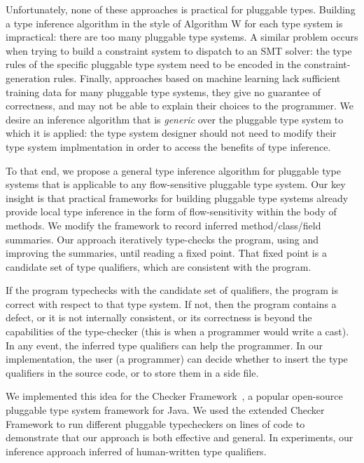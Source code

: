 Unfortunately, none of these approaches is practical for pluggable types.
Building a type inference algorithm in the style of Algorithm W for each
type system is impractical: there are too many pluggable type
systems.
A similar problem occurs when trying to build a constraint system to
dispatch to an SMT solver: the type rules of the specific pluggable type system
need to be encoded in the constraint-generation rules. Finally, approaches
based on machine learning lack sufficient training data for
many pluggable type systems, they give no guarantee of correctness, and may
not be able to explain their choices to the programmer.
%
We desire an
inference algorithm that is \emph{generic} over the pluggable type system
to which it is applied: the type system designer should not need to
modify their type system implmentation in order to access
the benefits of type inference.

To that end, we propose a general type inference algorithm for pluggable type
systems that is applicable to any flow-sensitive pluggable type system.
Our key insight is that
practical frameworks for building pluggable type systems already provide
local type inference in the form of flow-sensitivity within the body
of methods.
We modify the framework to record inferred method/class/field summaries.
Our approach iteratively type-checks the program, using and improving the
summaries, until reading a fixed point.
That fixed point is a candidate set of type qualifiers, which are
consistent with the program.

If the program typechecks with the candidate set of qualifiers, the program
is correct with respect to that type system.
If not, then the program contains a defect, or it is not internally
consistent, or its correctness is beyond the capabilities of the
type-checker (this is when a programmer would write a cast).
In any event, the inferred type qualifiers can help the programmer.
In our implementation, the user (a programmer) can decide whether to insert
the type qualifiers in the source code, or to store them in a side file.



We implemented this idea for the Checker Framework~\cite{PapiACPE2008},
a popular open-source pluggable type system
framework for Java.
%
%
We used the extended Checker Framework to run  different pluggable typecheckers
on  lines of code to demonstrate that
our approach is both effective and general.
In experiments, our inference approach inferred  of human-written
type qualifiers.


